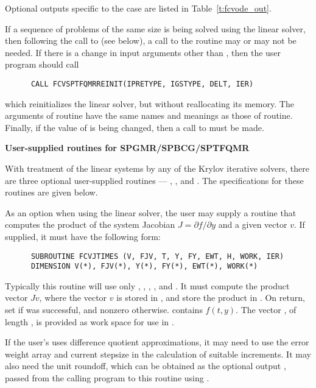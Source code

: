 \begin{Steps}
  Optional outputs specific to the {\sptfqmr} case are listed in Table~\ref{t:fcvode_out}.
  
  If a sequence of problems of the same size is being solved using the {\sptfqmr}
  linear solver, then following the call to  (see below), a call
  to the  routine may or may not be needed.  
  If there is a change in input arguments other than , then the user 
  program should call
\begin{verbatim}
      CALL FCVSPTFQMRREINIT(IPRETYPE, IGSTYPE, DELT, IER)
\end{verbatim}
  which reinitializes the {\spbcg} linear solver, but without reallocating its memory.
  The arguments of  routine have the same names and meanings
  as those of  routine.  Finally, if the value of  is
  being changed, then a call to  must be made.


 {\s}{\p} {\bf User-supplied routines for SPGMR/SPBCG/SPTFQMR}

  With treatment of the linear systems by any of the Krylov iterative
  solvers, there are three optional user-supplied routines ---
  , , and .  The specifications
  for these routines are given below.

  As an option when using the {\spgmr} linear solver, the user may supply a 
  routine that computes the product of the system Jacobian 
  $J = \partial f / \partial y$ 
  and a given vector $v$.  If supplied, it must have the following form:
\begin{verbatim}
      SUBROUTINE FCVJTIMES (V, FJV, T, Y, FY, EWT, H, WORK, IER)
      DIMENSION V(*), FJV(*), Y(*), FY(*), EWT(*), WORK(*)
\end{verbatim}
  Typically this routine will use only , , , , and
  .  It must compute the product vector $Jv$, where the vector $v$ is
  stored in , and store the product in .  On return, set
   if  was successful, and nonzero otherwise.
   contains $f(t,y)$. The vector , of length , is
  provided as work space for use in .

  If the user's  uses difference quotient approximations, it
  may need to use the error weight array  and current stepsize 
  in the calculation of suitable increments.  It may also need the unit
  roundoff, which can be obtained as the optional output ,
  passed from the calling program to this routine using .


\end{Steps}
